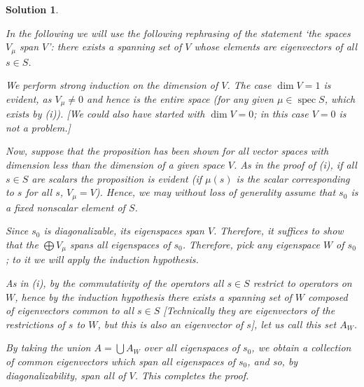 \documentclass{article}
\theoremstyle{nonumberplain}
\newtheorem{sol}{Solution}
\DeclareMathOperator{\spec}{spec}
\begin{document}
\begin{sol}
\begin{enumerate}
In the following we will use the following rephrasing of the statement `the spaces $V_\mu$ span $V$': there exists a spanning set of $V$ whose elements are eigenvectors of all $s \in S$.

We perform strong induction on the dimension of $V$. The case $\dim V = 1$ is evident, as $V_\mu \neq 0$ and hence is the entire space (for any given $\mu \in \spec S$, which exists by (i)). [We could also have started with $\dim V = 0$; in this case $V=0$ is not a problem.]

Now, suppose that the proposition has been shown for all vector spaces with dimension less than the dimension of a given space $V$. As in the proof of (i), if all $s \in S$ are scalars the proposition is evident (if $\mu(s)$ is the scalar corresponding to $s$ for all $s$, $V_\mu = V$). Hence, we may without loss of generality assume that $s_0$ is a fixed nonscalar element of $S$.

Since $s_0$ is diagonalizable, its eigenspaces span $V$. Therefore, it suffices to show that the $\bigoplus V_\mu$ spans all eigenspaces of $s_0$. Therefore, pick any eigenspace $W$ of $s_0$; to it we will apply the induction hypothesis.

As in (i), by the commutativity of the operators all $s \in S$ restrict to operators on $W$, hence by the induction hypothesis there exists a spanning set of $W$ composed of eigenvectors common to all $s \in S$ [Technically they are eigenvectors of the restrictions of $s$ to $W$, but this is also an eigenvector of $s$], let us call this set $A_W$.

By taking the union $A = \bigcup A_W$ over all eigenspaces of $s_0$, we obtain a collection of common eigenvectors which span all eigenspaces of $s_0$, and so, by diagonalizability, span all of $V$. This completes the proof.
\end{enumerate}
\end{sol}
\end{document}
